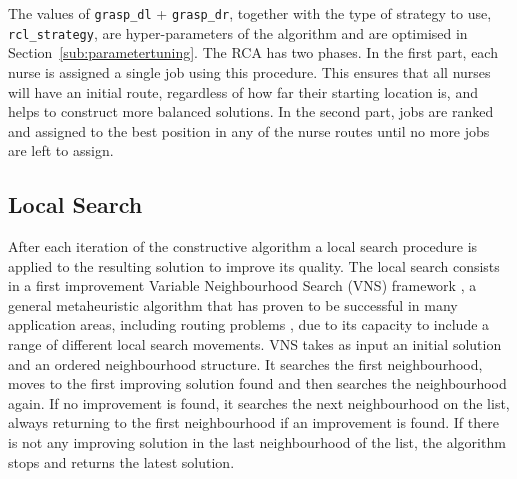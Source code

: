 \documentclass[a4paper,11pt,authoryear]{elsarticle}
\begin{document}
The values of \texttt{grasp\_dl} + \texttt{grasp\_dr}, together with the type of strategy to use, \texttt{rcl\_strategy}, are hyper-parameters of the algorithm and are optimised in Section~\ref{sub:parametertuning}. The RCA has two phases. In the first part, each nurse is assigned a single job using this procedure. This ensures that all nurses will have an initial route, regardless of how far their starting location is, and helps to construct more balanced solutions. In the second part, jobs are ranked and assigned to the best position in any of the nurse routes until no more jobs are left to assign. 

\subsection{Local Search}
\label{sub:localsearch}
\noindent After each iteration of the constructive algorithm a local search procedure is applied to the resulting solution to improve its quality. The local search consists in a first improvement Variable Neighbourhood Search (VNS) framework \citep{mladenovic1997}, a general metaheuristic algorithm that has proven to be successful in many application areas, including routing problems \citep{hansen2010}, due to its capacity to include a range of different local search movements. VNS takes as input an initial solution and an ordered neighbourhood structure. It searches the first neighbourhood, moves to the first improving solution found and then searches the neighbourhood again. If no improvement is found, it searches the next neighbourhood on the list, always returning to the first neighbourhood if an improvement is found. If there is not any improving solution in the last neighbourhood of the list, the algorithm stops and returns the latest solution.
\end{document}
